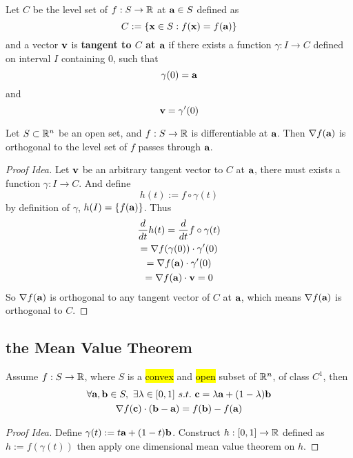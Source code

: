 \documentclass[11pt]{article}
\begin{document}
			\begin{definition}
				Let $C$ be the level set of $f: S \to \mathbb{R}$ at $\textbf{a} \in S$ defined as 
				\begin{equation}
					C := \{\textbf{x} \in S: f(\textbf{x}) = f(\textbf{a})\}
				\end{equation}
				and a vector $\textbf{v}$ is \textbf{tangent to $C$ at $\textbf{a}$} if there exists a function $\gamma: I \to C$ defined on interval $I$ containing $0$, such that
				\begin{equation}
					\gamma(0) = \textbf{a}
				\end{equation}
				and 
				\begin{equation}
					\textbf{v} = \gamma'(0)
				\end{equation}
			\end{definition}
			
			\begin{theorem}
				Let $S \subset \mathbb{R}^n$ be an open set, and $f: S \to \mathbb{R}$ is differentiable at $\textbf{a}$. Then $\nabla f(\textbf{a})$ is orthogonal to the level set of $f$ passes through $\textbf{a}$.
				\begin{proof}[Proof Idea]
					Let $\textbf{v}$ be an arbitrary tangent vector to $C$ at $\textbf{a}$, there must exists a function $\gamma: I \to C$. And define 
					\begin{equation}
						h(t) := f \circ \gamma (t)
					\end{equation}
					by definition of $\gamma$, $h(I) = \{f(\textbf{a})\}$. Thus
					\begin{gather}
						\frac{d}{dt}h(t) = \frac{d}{dt} f \circ \gamma (t) \\
						= \nabla f (\gamma(0)) \cdot \gamma'(0) \\
						= \nabla f(\textbf{a}) \cdot \gamma'(0) \\
						= \nabla f(\textbf{a}) \cdot \textbf{v} = 0
					\end{gather}
					So $\nabla f(\textbf{a})$ is orthogonal to any tangent vector of $C$ at $\textbf{a}$, which means $\nabla f(\textbf{a})$ is orthogonal to $C$.
				\end{proof}
			\end{theorem}
			
			
		\subsection{the Mean Value Theorem}
			\begin{theorem}
				Assume $f: S \to \mathbb{R}$, where $S$ is a \hl{convex} and \hl{open} subset of $\mathbb{R}^n$, of class $C^1$, then
				\begin{gather}
					\forall \textbf{a}, \textbf{b} \in S,\ \exists \lambda \in [0, 1]\ s.t.\ \textbf{c} = \lambda \textbf{a} + (1 - \lambda) \textbf{b} \\
					\nabla f(\textbf{c}) \cdot (\textbf{b} - \textbf{a}) = f(\textbf{b}) - f(\textbf{a})
				\end{gather}
				\begin{proof}[Proof Idea]
					Define $\gamma(t) := t \textbf{a} + (1-t)\textbf{b}$.
					Construct $h: [0, 1] \to \mathbb{R}$ defined as $h := f(\gamma(t))$
					then apply one dimensional mean value theorem on $h$.
				\end{proof}
			\end{theorem}
			
\end{document}

